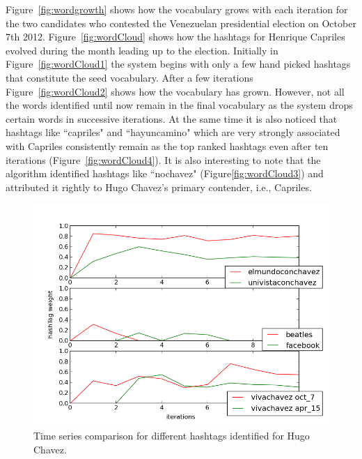 Figure~\ref{fig:wordgrowth} shows  how the vocabulary grows with each iteration for the two candidates who contested the Venezuelan presidential election on October 7th 2012.
Figure~\ref{fig:wordCloud} shows how the hashtags for Henrique Capriles evolved during the month leading up to the election.
Initially in Figure~\ref{fig:wordCloud1} the system begins with only a few hand picked hashtags that constitute the seed vocabulary. 
After a few iterations Figure~\ref{fig:wordCloud2} shows how the vocabulary has grown.
However, not all the words identified until now remain in the final vocabulary as the system drops certain words in successive iterations.
At the same time it is also noticed that hashtags like ``capriles" and ``hayuncamino" which are very strongly associated with Capriles consistently remain as the top ranked hashtags even after ten iterations (Figure~\ref{fig:wordCloud4}). 
It is also interesting to note that the algorithm identified hashtags like ``nochavez" (Figure\ref{fig:wordCloud3}) and attributed it rightly to Hugo Chavez's primary contender, i.e., Capriles. 

\begin{figure}[Ht]
	\centering
	\includegraphics[scale=0.65]{support_files/hashTagTimeSeries.png}
	\caption{Time series comparison for different hashtags identified for Hugo Chavez.}
	\label{fig:timeSeries}
\end{figure}

